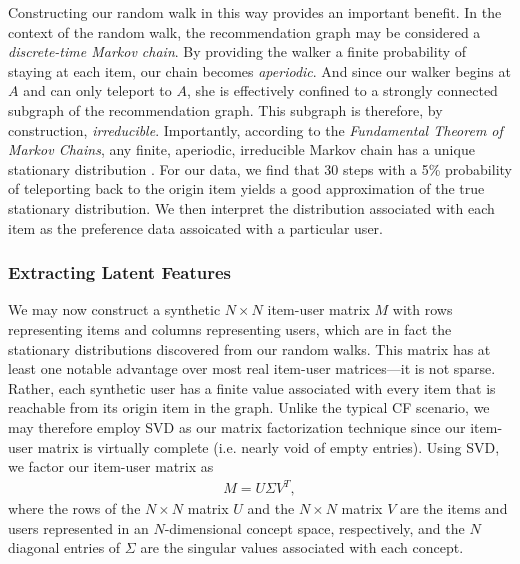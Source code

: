\documentclass[11pt]{article}
\begin{document}
Constructing our random walk in this way provides an important benefit. In the
context of the random walk, the recommendation graph may be considered a {\em
discrete-time Markov chain}. By providing the walker a finite probability of
staying at each item, our chain becomes {\em aperiodic}. And since our walker
begins at $A$ and can only teleport to $A$, she is effectively confined to a
strongly connected subgraph of the recommendation graph. This subgraph is
therefore, by construction, {\em irreducible}.  Importantly, according to the
{\em Fundamental Theorem of Markov Chains}, any finite, aperiodic, irreducible
Markov chain has a unique stationary distribution \cite{Norris1998}. For our
data, we find that 30 steps with a 5\% probability of teleporting back to the
origin item yields a good approximation of the true stationary distribution. We
then interpret the distribution associated with each item as the preference data
assoicated with a particular user.

\subsubsection*{Extracting Latent Features}
We may now construct a synthetic $N \times N$ item-user matrix $M$ with rows
representing items and columns representing users, which are in fact the
stationary distributions discovered from our random walks. This matrix has at
least one notable advantage over most real item-user matrices---it is not
sparse.  Rather, each synthetic user has a finite value associated with every
item that is reachable from its origin item in the graph. Unlike the typical CF
scenario, we may therefore employ SVD as our matrix factorization technique
since our item-user matrix is virtually complete (i.e. nearly void of empty
entries).  Using SVD, we factor our item-user matrix as
\begin{align}
M = U \Sigma V^T,
\end{align}
where the rows of the $N \times N$ matrix $U$ and the $N \times N$ matrix $V$
are the items and users represented in an $N$-dimensional concept space,
respectively, and the $N$ diagonal entries of $\Sigma$ are the singular values
associated with each concept.
\end{document}
